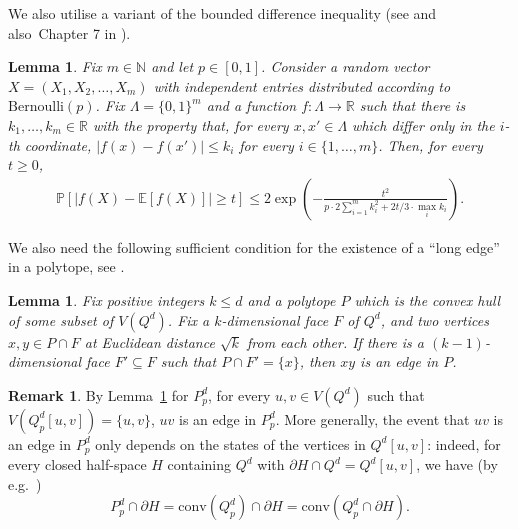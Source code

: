 \documentclass{article}
\newtheorem{lemma}[thm]{Lemma}
\theoremstyle{definition}
\newtheorem{remark}[thm]{Remark}
\begin{document}
We also utilise a variant of the bounded difference inequality (see \cite{War16} and also~Chapter 7 in \cite{AS16}).
\begin{lemma}\label{l: azuma}
Fix $m\in \mathbb{N}$ and let $p\in [0,1]$. Consider a random vector $X = (X_1,X_2,\ldots, X_m)$ with independent entries distributed according to $\mathrm{Bernoulli}(p)$. 
Fix $\Lambda = \{0,1\}^m$ and a function $f:\Lambda\to\mathbb{R}$ such that there is $k_1,\ldots, k_m \in \mathbb{R}$ with the property that, for every $x,x' \in \Lambda$ which differ only in the $i$-th coordinate, $|f(x)-f(x')|\le k_i$ for every $i\in \{1,\ldots, m\}$. 
Then, for every $t\ge 0$,
\begin{align*}
    \mathbb{P}\left[\big|f(X)-\mathbb{E}\left[f(X)\right]\big|\ge t\right]\le 2\exp\left(-\frac{t^2}{p\cdot 2\sum_{i=1}^mk_i^2+2t/3\cdot \max_ik_i}\right).
\end{align*}
\end{lemma}

We also need the following sufficient condition for the existence of a ``long edge'' in a polytope, see \cite[Proposition 2.6]{FKSS26}.

\begin{lemma}\label{lem: poly long edge exists}
Fix positive integers $k\le d$ and a polytope $P$ which is the convex hull of some subset of $V(Q^d)$.
Fix a $k$-dimensional face $F$ of $Q^d$, and two vertices $x,y\in P\cap F$ at Euclidean distance $\sqrt{k}$ from each other. 
If there is a $(k-1)$-dimensional face $F'\subseteq F$ such that $P\cap F'=\{x\}$, then $xy$ is an edge in $P$.
\end{lemma}

\begin{remark}\label{remark: edge via cube}
By Lemma~\ref{lem: poly long edge exists} for $P^d_p$, for every $u,v\in V(Q^d)$ such that $V(Q^d_p[u,v])=\{u,v\}$, $uv$ is an edge in $P^d_p$.
More generally, the event that $uv$ is an edge in $P^d_p$ only depends on the states of the vertices in $Q^d[u,v]$: indeed, for every closed half-space $H$ containing $Q^d$ with $\partial H\cap Q^d=Q^d[u,v]$, 
we have (by e.g.\ \cite[Claim 2.8]{FKSS26})
\[P^d_p\cap \partial H = \mathrm{conv}(Q^d_p)\cap \partial H = \mathrm{conv}(Q^d_p\cap \partial H).\]
\end{remark}
\end{document}
